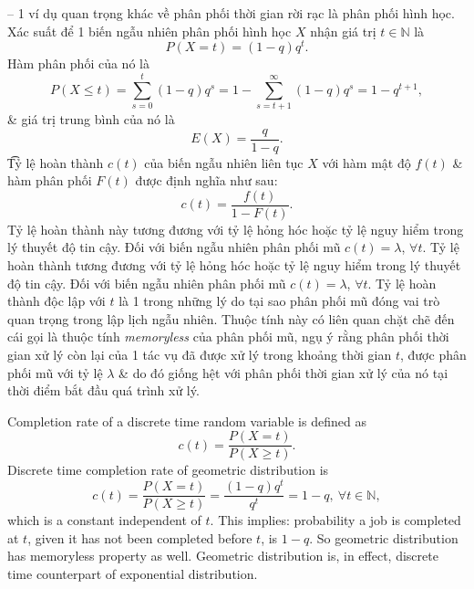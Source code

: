 \documentclass{article}
\begin{document}
\begin{itemize}
\begin{itemize}
        -- 1 ví dụ quan trọng khác về phân phối thời gian rời rạc là phân phối hình học. Xác suất để 1 biến ngẫu nhiên phân phối hình học $X$ nhận giá trị $t\in\mathbb{N}$ là
        \begin{equation*}
            P(X = t) = (1 - q)q^t.
        \end{equation*}
        Hàm phân phối của nó là
        \begin{equation*}
            P(X\le t) = \sum_{s=0}^t (1 - q)q^s = 1 - \sum_{s=t+1}^\infty (1 - q)q^s = 1 - q^{t+1},
        \end{equation*}
        \& giá trị trung bình của nó là
        \begin{equation*}
            E(X) = \frac{q}{1 - q}.
        \end{equation*}
        {\t Tỷ lệ hoàn thành} $c(t)$ của biến ngẫu nhiên liên tục $X$ với hàm mật độ $f(t)$ \& hàm phân phối $F(t)$ được định nghĩa như sau:
        \begin{equation*}
            c(t) = \frac{f(t)}{1 - F(t)}.
        \end{equation*}
        Tỷ lệ hoàn thành này tương đương với tỷ lệ hỏng hóc hoặc tỷ lệ nguy hiểm trong lý thuyết độ tin cậy. Đối với biến ngẫu nhiên phân phối mũ $c(t) = \lambda$, $\forall t$. Tỷ lệ hoàn thành tương đương với tỷ lệ hỏng hóc hoặc tỷ lệ nguy hiểm trong lý thuyết độ tin cậy. Đối với biến ngẫu nhiên phân phối mũ $c(t) = \lambda$, $\forall t$. Tỷ lệ hoàn thành độc lập với $t$ là 1 trong những lý do tại sao phân phối mũ đóng vai trò quan trọng trong lập lịch ngẫu nhiên. Thuộc tính này có liên quan chặt chẽ đến cái gọi là thuộc tính {\it memoryless} của phân phối mũ, ngụ ý rằng phân phối thời gian xử lý còn lại của 1 tác vụ đã được xử lý trong khoảng thời gian $t$, được phân phối mũ với tỷ lệ $\lambda$ \& do đó giống hệt với phân phối thời gian xử lý của nó tại thời điểm bắt đầu quá trình xử lý.

        Completion rate of a discrete time random variable is defined as
        \begin{equation*}
            c(t) = \frac{P(X = t)}{P(X\ge t)}.
        \end{equation*}
        Discrete time completion rate of geometric distribution is
        \begin{equation*}
            c(t) = \frac{P(X = t)}{P(X\ge t)} = \frac{(1 - q)q^t}{q^t} = 1 - q,\ \forall t\in\mathbb{N},
        \end{equation*}
        which is a constant independent of $t$. This implies: probability a job is completed at $t$, given it has not been completed before $t$, is $1 - q$. So geometric distribution has memoryless property as well. Geometric distribution is, in effect, discrete time counterpart of exponential distribution.


\end{itemize}
\end{itemize}
\end{document}
